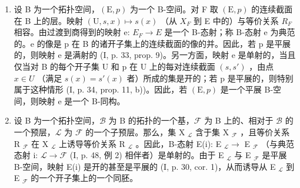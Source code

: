\begin{enumerate}
\def\labelenumi{\arabic{enumi})}
\setcounter{enumi}{1}
\item
  设 B 为一个拓扑空间，\((\mathrm{E},p)\) 为一个 B-空间。对 F 取 \((\mathrm{E},p)\) 的连续截面在 B 上的层。映射 \((\mathrm{U},s,x)\mapsto s(x)\) （从 \(X_{F}\) 到 E 中的）与等价关系 \(R_{F}\) 相容。由过渡到商得到的映射 e: \(E_{F}\to E\) 是一个 B-态射；称 B-态射 e 为典范的。e 的像是 p 在 B 的诸开子集上的连续截面的像的并。因此，若 p 是平展的，则映射 e 是满射的 (I, p. 33, prop. 9)。另一方面，映射 e 是单射的，当且仅当对 B 的每个开子集 U 和 p 在 U 上的每对连续截面 \((s,s')\) ，由点 \(x\in U\) （满足 \(s(x)=s'(x)\) 者）所成的集是开的；若 p 是平展的，则特别属于这种情形 (I, p. 34, prop. 11, b))。因此，若 \((\mathrm{E},p)\) 是一个平展 B-空间，则映射 e 是一个 B-同构。
\item
  设 B 为一个拓扑空间，\(\mathcal{B}\) 为 B 的拓扑的一个基，\(\mathcal{F}\) 为 B 上的、相对于 \(\mathcal{B}\) 的一个预层，\(\mathcal{L}\) 为 \(\mathcal{F}\) 的一个子预层。那么，集 X \(_{\mathcal{L}}\) 含于集 X \(_{\mathcal{F}}\) ，且等价关系 R \(_{\mathcal{F}}\) 在 X \(_{\mathcal{L}}\) 上诱导等价关系 R \(_{\mathcal{L}}\) 。因此，B-态射 E(i): E \(_{\mathcal{L}} \to\) E \(_{\mathcal{F}}\) （与典范态射 i: \(\mathcal{L} \to \mathcal{F}\) (I, p. 48, 例 2) 相伴者）是单射的。由于 E \(_{\mathcal{L}}\) 与 E \(_{\mathcal{F}}\) 是平展 B-空间，映射 E(i) 是开的甚至是平展的 (I, p. 30, cor. 1)，从而诱导从 E \(_{\mathcal{L}}\) 到 E \(_{\mathcal{F}}\) 的一个开子集上的一个同胚。
\end{enumerate}

